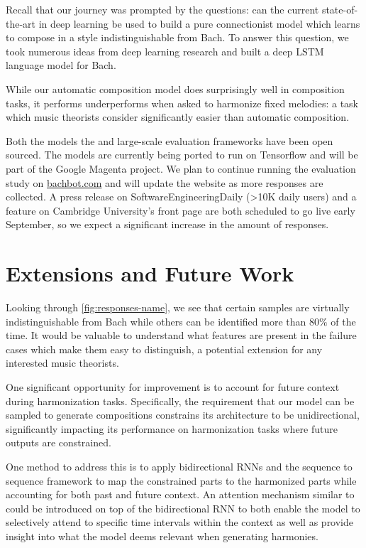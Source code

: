Recall that our journey was prompted by the questions: can the current
state-of-the-art in deep learning be used to build a pure connectionist
model which learns to compose in a style indistinguishable from Bach. To
answer this question, we took numerous ideas from deep learning research
and built a deep LSTM language model for Bach.

While our automatic composition model does surprisingly well in composition
tasks, it performs underperforms when asked to harmonize fixed melodies: a task
which music theorists consider significantly easier than automatic composition.

Both the models the and large-scale evaluation frameworks have been open
sourced. The models are currently being ported to run on Tensorflow and will be
part of the Google Magenta project. We plan to continue running the evaluation
study on \url{bachbot.com} and will update the website as more responses are
collected. A press release on SoftwareEngineeringDaily (>10K daily users) and a
feature on Cambridge University's front page are both scheduled to go live
early September, so we expect a significant increase in the amount of
responses.

\section{Extensions and Future Work}

Looking through \vref{fig:responses-name}, we see that certain
samples are virtually indistinguishable from Bach while others
can be identified more than $80\%$ of the time. It would be valuable
to understand what features are present in the failure cases which
make them easy to distinguish, a potential extension for any
interested music theorists.

One significant opportunity for improvement is to account for future
context during harmonization tasks. Specifically, the requirement that
our model can be sampled to generate compositions constrains its
architecture to be unidirectional, significantly impacting its
performance on harmonization tasks where future outputs are constrained.

One method to address this is to apply bidirectional
RNNs\citep{Graves2005} and the sequence to sequence
framework\citep{sutskever2014sequence} to map the constrained parts to
the harmonized parts while accounting for both past and future context.
An attention mechanism similar to \citet{Bahdanau2015} could be
introduced on top of the bidirectional RNN to both enable the model to
selectively attend to specific time intervals within the context as well
as provide insight into what the model deems relevant when generating
harmonies.

